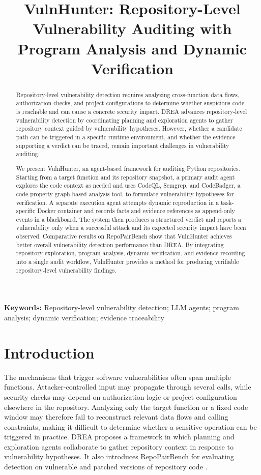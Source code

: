 \documentclass[10pt,a4paper]{article}
\title{VulnHunter: Repository-Level Vulnerability Auditing with Program Analysis and Dynamic Verification}
\author{}
\date{}
\begin{document}
\maketitle


\begin{abstract}

Repository-level vulnerability detection requires analyzing cross-function data flows, authorization checks, and project configurations to determine whether suspicious code is reachable and can cause a concrete security impact. DREA advances repository-level vulnerability detection by coordinating planning and exploration agents to gather repository context guided by vulnerability hypotheses. However, whether a candidate path can be triggered in a specific runtime environment, and whether the evidence supporting a verdict can be traced, remain important challenges in vulnerability auditing.

We present VulnHunter, an agent-based framework for auditing Python repositories. Starting from a target function and its repository snapshot, a primary audit agent explores the code context as needed and uses CodeQL, Semgrep, and CodeBadger, a code property graph-based analysis tool, to formulate vulnerability hypotheses for verification. A separate execution agent attempts dynamic reproduction in a task-specific Docker container and records facts and evidence references as append-only events in a blackboard. The system then produces a structured verdict and reports a vulnerability only when a successful attack and its expected security impact have been observed. Comparative results on RepoPairBench show that VulnHunter achieves better overall vulnerability detection performance than DREA. By integrating repository exploration, program analysis, dynamic verification, and evidence recording into a single audit workflow, VulnHunter provides a method for producing verifiable repository-level vulnerability findings.

\end{abstract}

\noindent\textbf{Keywords:} Repository-level vulnerability detection; LLM agents; program analysis; dynamic verification; evidence traceability


\section{Introduction}

The mechanisms that trigger software vulnerabilities often span multiple functions. Attacker-controlled input may propagate through several calls, while security checks may depend on authorization logic or project configuration elsewhere in the repository. Analyzing only the target function or a fixed code window may therefore fail to reconstruct relevant data flows and calling constraints, making it difficult to determine whether a sensitive operation can be triggered in practice. DREA proposes a framework in which planning and exploration agents collaborate to gather repository context in response to vulnerability hypotheses. It also introduces RepoPairBench for evaluating detection on vulnerable and patched versions of repository code \cite{sun2026drea}.
\end{document}
